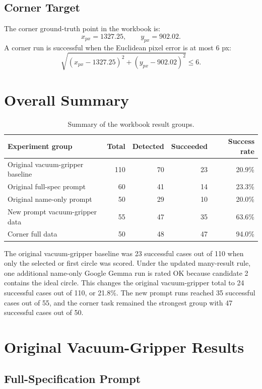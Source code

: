 \documentclass[11pt,a4paper]{article}
\begin{document}
\subsection{Corner Target}

The corner ground-truth point in the workbook is:
\[
  x_{px}=1327.25,\qquad y_{px}=902.02.
\]
A corner run is successful when the Euclidean pixel error is at most 6 px:
\[
  \sqrt{(x_{px}-1327.25)^2+(y_{px}-902.02)^2}\leq 6.
\]

\section{Overall Summary}

\begin{table}[htbp]
\centering
\begin{tabular}{L{5.4cm}rrrr}
\toprule
Experiment group & Total & Detected & Succeeded & Success rate \\
\midrule
Original vacuum-gripper baseline & 110 & 70 & 23 & 20.9\% \\
Original full-spec prompt & 60 & 41 & 14 & 23.3\% \\
Original name-only prompt & 50 & 29 & 10 & 20.0\% \\
New prompt vacuum-gripper data & 55 & 47 & 35 & 63.6\% \\
Corner full data & 50 & 48 & 47 & 94.0\% \\
\bottomrule
\end{tabular}
\caption{Summary of the workbook result groups.}
\end{table}

The original vacuum-gripper baseline was 23 successful cases out of 110 when only the selected or first circle was scored. Under the updated many-result rule, one additional name-only Google Gemma run is rated OK because candidate 2 contains the ideal circle. This changes the original vacuum-gripper total to 24 successful cases out of 110, or 21.8\%. The new prompt runs reached 35 successful cases out of 55, and the corner task remained the strongest group with 47 successful cases out of 50.

\section{Original Vacuum-Gripper Results}

\subsection{Full-Specification Prompt}
\end{document}
